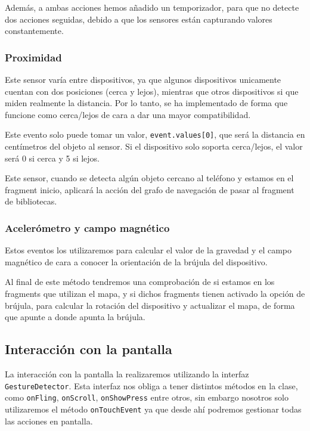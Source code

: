 Además, a ambas acciones hemos añadido un temporizador, para que no detecte dos acciones seguidas, debido a que los sensores están capturando valores constantemente.

\subsubsection{Proximidad}

Este sensor varía entre dispositivos, ya que algunos dispositivos unicamente cuentan con dos posiciones (cerca y lejos), mientras que otros dispositivos si que miden realmente la distancia. Por lo tanto, se ha implementado de forma que funcione como cerca/lejos de cara a dar una mayor compatibilidad.

Este evento solo puede tomar un valor, \texttt{event.values[0]}, que será la distancia en centímetros del objeto al sensor. Si el dispositivo solo soporta cerca/lejos, el valor será 0 si cerca y 5 si lejos.

Este sensor, cuando se detecta algún objeto cercano al teléfono y estamos en el fragment inicio, aplicará la acción del grafo de navegación de pasar al fragment de bibliotecas.

\subsubsection{Acelerómetro y campo magnético}

Estos eventos los utilizaremos para calcular el valor de la gravedad y el campo magnético de cara a conocer la orientación de la brújula del dispositivo.

Al final de este método tendremos una comprobación de si estamos en los fragments que utilizan el mapa, y si dichos fragments tienen activado la opción de brújula, para calcular la rotación del dispositivo y actualizar el mapa, de forma que apunte a donde apunta la brújula.


\subsection{Interacción con la pantalla}

La interacción con la pantalla la realizaremos utilizando la interfaz \texttt{GestureDetector}. Esta interfaz nos obliga a tener distintos métodos en la clase, como \texttt{onFling}, \texttt{onScroll}, \texttt{onShowPress} entre otros, sin embargo nosotros solo utilizaremos el método \texttt{onTouchEvent} ya que desde ahí podremos gestionar todas las acciones en pantalla.

